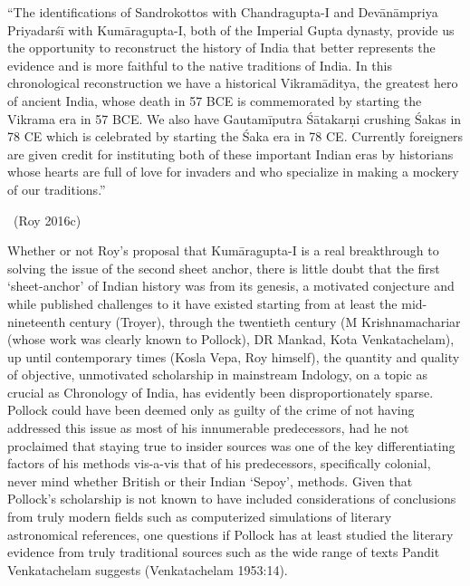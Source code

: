 \begin{myquote}
“The identifications of Sandrokottos with Chandragupta-I and Devānāmpriya Priyadarśī with Kumāragupta-I, both of the Imperial Gupta dynasty, provide us the opportunity to reconstruct the history of India that better represents the evidence and is more faithful to the native traditions of India. In this chronological reconstruction we have a historical Vikramā\-ditya, the greatest hero of ancient India, whose death in 57 BCE is commemorated by starting the Vikrama era in 57 BCE. We also have Gautamīputra Śātakarṇi crushing Śakas in 78 CE which is celebrated by starting the Śaka era in 78 CE. Currently foreigners are given credit for instituting both of these important Indian eras by historians whose hearts are full of love for invaders and who specialize in making a mockery of our traditions.” 

~\hfill (Roy 2016c)
\end{myquote}

Whether or not Roy’s proposal that Kumāragupta-I is a real breakthrough to solving the issue of the second sheet anchor, there is little doubt that the first ‘sheet-anchor’ of Indian history was from its genesis, a motivated conjecture and while published challenges to it have existed starting from at least the mid-nineteenth century (Troyer), through the twentieth century (M Krishnamachariar (whose work was clearly known to Pollock), DR Mankad, Kota Venkatachelam), up until contemporary times (Kosla Vepa, Roy himself), the quantity and quality of objective, unmotivated scholarship in mainstream Indology, on a topic as crucial as Chronology of India, has evidently been disproportionately sparse. Pollock could have been deemed only as guilty of the crime of not having addressed this issue as most of his innumerable predecessors, had he not proclaimed that staying true to insider sources was one of the key differentiating factors of his methods vis-a-vis that of his predecessors, specifically colonial, never mind whether British or their Indian ‘Sepoy’, methods. Given that Pollock’s scholarship is not known to have included considerations of conclusions from truly modern fields such as computerized simulations of literary astronomical references, one questions if Pollock has at least studied the literary evidence from truly traditional sources such as the wide range of texts Pandit Venkatachelam suggests (Venkatachelam 1953:14).



